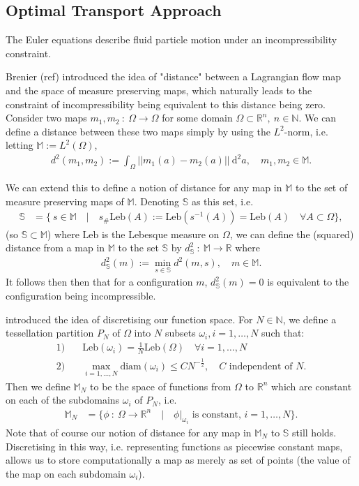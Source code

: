 \documentclass[11pt, oneside]{article}   	%
\newcommand{\R}{\mathbb{R}}
\newcommand{\MN}{\mathbb{M}_N}
\newcommand{\dsmsq}{d^{2}_{\mathbb{S}}(m)}
\newcommand{\M}{\mathbb{M}}
\newcommand{\N}{\mathbb{N}}
\newcommand{\Sb}{\mathbb{S}}
\newcommand{\Leb}{\mathrm{Leb}}
\begin{document}
\subsection{Optimal Transport Approach}

The Euler equations describe fluid particle motion under an incompressibility constraint. 

Brenier (ref) introduced the idea of "distance" between a Lagrangian flow map and the space of measure preserving maps, which naturally leads to the constraint of incompressibility being equivalent to this distance being zero. Consider two maps \(m_1, m_2 \: : \: \Omega \to \Omega\) for some domain \(\Omega \subset \R^n, \: n \in \N\). We can define a distance between these two maps simply by using the \(L^2\)-norm, i.e. letting \(\M := L^2(\Omega)\), 
\begin{align}
d^2(m_1, m_2) := \int_\Omega || m_1(a) - m_2(a) || \: \mathrm{d}^2 a, \quad m_1, m_2 \in \M.
\end{align}

We can extend this to define a notion of distance for any map in \(\M\) to the set of measure preserving maps of \(\M\). Denoting \(\Sb\) as this set, i.e. 
\begin{align}
\Sb &= \{ \: s \in \M \quad | \quad s_{\#}\Leb(A) := \Leb(s^{-1}(A)) = \Leb(A) \quad \forall A \subset \Omega \},
\end{align}
(so \(\Sb \subset \M\)) where \(\Leb\) is the Lebesque measure on \(\Omega\), we can define the (squared) distance from a map in \(\M\) to the set \(\Sb\) by \(d^2_\Sb \: : \: \M \to \R\) where
\begin{align}
\dsmsq := \min_{s \in \mathbb{S}} d^2(m, s), \quad m \in \M.
\end{align}
It follows then then that for a configuration \(m\), \(\dsmsq = 0\) is equivalent to the configuration being incompressible.

\cite{gallouet2016lagrangian} introduced the idea of discretising our function space. For \(N \in \N\), we define a tessellation partition \(P_N\) of \(\Omega\) into \(N\) subsets \(\omega_i, i=1,\dots,N\) such that:
\begin{align}
1)& \quad \Leb(\omega_i) = \frac{1}{N}\Leb(\Omega) \quad \forall i = 1,\dots,N \\
2)& \quad \max_{i = 1,\dots,N} \mathrm{diam}(\omega_i) \le CN^{-\frac{1}{2}}, \quad C \text{ independent of } N.
\end{align}
Then we define \(\MN\) to be the space of functions from \(\Omega\) to \(\R^n\) which are constant on each of the subdomains \(\omega_i\) of \(P_N\), i.e.
\begin{align}
\MN &= \{ \phi \: : \: \Omega \to \R^n \quad | \quad \phi | _{\omega_i} \text{ is constant, } i = 1,\dots,N\}.
\end{align}
Note that of course our notion of distance for any map in \(\MN\) to \(\Sb\) still holds. Discretising in this way, i.e. representing functions as piecewise constant maps, allows us to store computationally a map as merely as set of points (the value of the map on each subdomain \(\omega_i\)).
\end{document}
